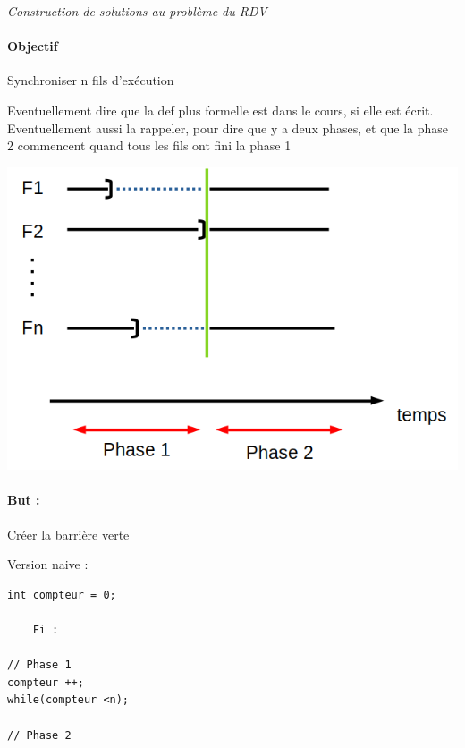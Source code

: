 
\textit{Construction de solutions au problème du RDV}

\paragraph{Objectif} Synchroniser n fils d'exécution

\begin{com}
	Eventuellement dire que la def plus formelle est dans le cours, si elle est écrit. Eventuellement aussi la rappeler, pour dire que y a deux phases, et que la phase 2 commencent quand tous les fils ont fini la phase 1
\end{com} 

\begin{minipage}{0.7\linewidth}
	\includegraphics[scale=0.5]{Developpements/probleme du rdv/cas_gen.png}
\end{minipage}
\begin{minipage}{0.3\linewidth}
	\paragraph{But :} Créer la barrière verte
\end{minipage}

\begin{minipage}{0.5\linewidth}
Version naive :
\begin{lstlisting}
int compteur = 0;

    Fi :
	
// Phase 1
compteur ++;
while(compteur <n);

// Phase 2
\end{lstlisting}
\end{minipage}


